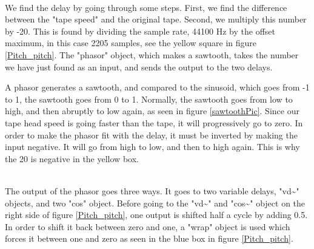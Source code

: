 \begin{minipage}{\linewidth}%
\label{Pitch_pitch}
\end{minipage}\\

We find the delay by going through some steps. First, we find the difference between the "tape speed" and the original tape. Second, we multiply this number by -20. This is found by dividing the sample rate, 44100 Hz by the offset maximum, in this case 2205 samples, see the yellow square in figure \ref{Pitch_pitch}. The "phasor" object, which makes a sawtooth, takes the number we have just found as an input, and sends the output to the two delays. 

A phasor generates a sawtooth, and compared to the sinusoid, which goes from -1 to 1, the sawtooth goes from 0 to 1\citep{FlossManuals}. Normally, the sawtooth goes from low to high, and then abruptly to low again, as seen in figure \ref{sawtoothPic}. Since our tape head speed is going faster than the tape, it will progressively go to zero. In order to make the phasor fit with the delay, it must be inverted by making the input negative. It will go from high to low, and then to high again. This is why the 20 is negative in the yellow box.   

\begin{minipage}{\linewidth}%
\label{sawtoothPic}
\end{minipage}\\

The output of the phasor goes three ways. It goes to two variable delays, "vd\textasciitilde" objects, and two "cos" object. Before going to the "vd\textasciitilde" and "cos\textasciitilde" object on the right side of figure \ref{Pitch_pitch}, one output is shifted half a cycle by adding 0.5. In order to shift it back between zero and one, a "wrap" object is used which forces it between one and zero as seen in the blue box in figure \ref{Pitch_pitch}.\\

